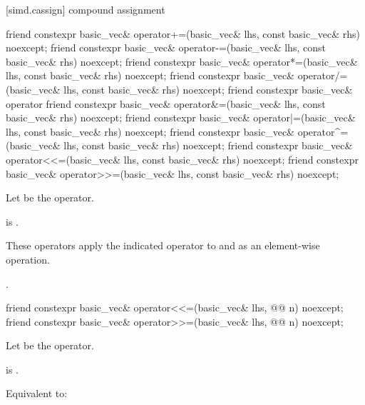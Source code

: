 [simd.cassign]{ compound assignment}

\begin{itemdecl}
friend constexpr basic_vec& operator+=(basic_vec& lhs, const basic_vec& rhs) noexcept;
friend constexpr basic_vec& operator-=(basic_vec& lhs, const basic_vec& rhs) noexcept;
friend constexpr basic_vec& operator*=(basic_vec& lhs, const basic_vec& rhs) noexcept;
friend constexpr basic_vec& operator/=(basic_vec& lhs, const basic_vec& rhs) noexcept;
friend constexpr basic_vec& operator%
friend constexpr basic_vec& operator&=(basic_vec& lhs, const basic_vec& rhs) noexcept;
friend constexpr basic_vec& operator|=(basic_vec& lhs, const basic_vec& rhs) noexcept;
friend constexpr basic_vec& operator^=(basic_vec& lhs, const basic_vec& rhs) noexcept;
friend constexpr basic_vec& operator<<=(basic_vec& lhs, const basic_vec& rhs) noexcept;
friend constexpr basic_vec& operator>>=(basic_vec& lhs, const basic_vec& rhs) noexcept;
\end{itemdecl}

\begin{itemdescr}
\pnum
Let  be the operator.

\pnum
\constraints
{} is
.

\pnum
\effects
These operators apply the indicated operator to  and  as
an element-wise operation.

\pnum
\returns
{}.
\end{itemdescr}

\begin{itemdecl}
friend constexpr basic_vec& operator<<=(basic_vec& lhs, @@ n) noexcept;
friend constexpr basic_vec& operator>>=(basic_vec& lhs, @@ n) noexcept;
\end{itemdecl}

\begin{itemdescr}
\pnum
Let  be the operator.

\pnum
\constraints
{} is .

\pnum
\effects
Equivalent to: 
\end{itemdescr}

